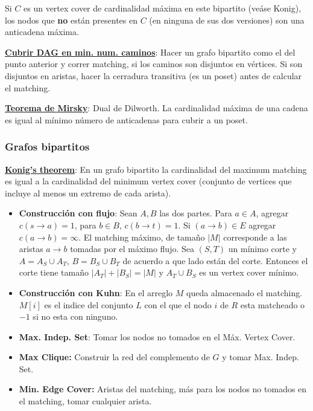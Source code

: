 Si $C$ es un vertex cover de cardinalidad máxima en este bipartito (veáse Konig), los nodos que \textbf{no} están presentes en $C$ (en ninguna de sus dos versiones) son una anticadena máxima.


\ul{\textbf{Cubrir DAG en min. num. caminos}}:
Hacer un grafo bipartito como el del punto anterior y correr matching, si los caminos son disjuntos en vértices. Si son disjuntos en aristas, hacer la cerradura transitiva (es un poset) antes de calcular el matching.

   
\ul{\textbf{Teorema de Mirsky}}: Dual de Dilworth. La cardinalidad máxima de una cadena es igual al mínimo número de anticadenas para cubrir a un poset.\linebreak\linebreak\linebreak

\subsubsection{Grafos bipartitos}

\ul{\textbf{Konig's theorem}}: En un grafo bipartito la cardinalidad del maximum matching es igual a la cardinalidad del minimum vertex cover (conjunto de vertices que incluye al menos un extremo de cada arista).
\begin{itemize}
    \item \textbf{Construcción con flujo}: Sean $A, B$ las dos partes. Para $a \in A$, agregar $c(s\to a) = 1$, para $b \in B$, $c(b\to t) = 1$.
    Si $(a\to b) \in E$ agregar $c(a\to b) = \infty$. El matching máximo, de tamaño $|M|$ corresponde a las aristas $a \to b$ tomadas por el máximo flujo. Sea $(S, T)$ un mínimo corte y $A = A_S \cup A_T$, $B = B_S \cup B_T$ de acuerdo a que lado están del corte. Entonces el corte tiene tamaño $|A_T| + |B_S| = |M|$ y $A_T \cup B_S$ es un vertex cover mínimo.
    \item \textbf{Construcción con Kuhn}: En el arreglo $M$ queda almacenado el matching. $M[i]$ es el indice del conjunto $L$ con el que el nodo $i$ de $R$ esta matcheado o $-1$ si no esta con ninguno.
        \item \textbf{Max. Indep. Set}: Tomar los nodos no tomados en el Máx. Vertex Cover.
\item \textbf{Max Clique:} Construir la red del complemento de $G$ y tomar Max. Indep. Set.
    \item \textbf{Min. Edge Cover:} Aristas del matching, más para los nodos no tomados en el matching, tomar cualquier arista.
\end{itemize}

